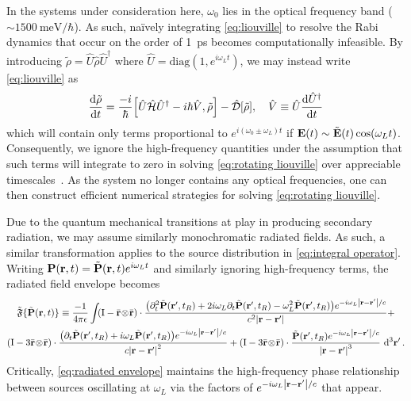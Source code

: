 In the systems under consideration here, $\omega_0$ lies in the optical frequency band ($\sim \SI{1500}{\milli\eV\per\hbar}$).
As such, na\"ively integrating \cref{eq:liouville} to resolve the Rabi dynamics that occur on the order of \SI{1}{\pico\second} becomes computationally infeasible.
By introducing $\tilde{\rho} = \hat{U} \hat{\rho} \hat{U}^\dagger$ where $\hat{U} = \mathrm{diag}(1, e^{i \omega_L t})$, we may instead write \cref{eq:liouville} as
\begin{equation}
  \dv{\tilde{\rho}}{t} = \frac{-i}{\hbar} \commutator{\hat{U} \hat{\mathcal{H}} \hat{U}^\dagger - i \hbar \hat{V}}{\tilde{\rho}} - \hat{\mathcal{D}}\qty[\tilde{\rho}], \quad \hat{V} \equiv \hat{U} \dv{\hat{U}^\dagger}{t}
  \label{eq:rotating liouville}
\end{equation}
which will contain only terms proportional to $e^{i (\omega_0 \pm \omega_L) t}$ if $\vb{E}(t) \sim \tilde{\vb{E}}(t)\cos(\omega_L t)$.
Consequently, we ignore the high-frequency quantities under the assumption that such terms will integrate to zero in solving \cref{eq:rotating liouville} over appreciable timescales~\cite{Allen1975}. As the system no longer contains any optical frequencies, one can then construct efficient numerical strategies for solving \cref{eq:rotating liouville}.

Due to the quantum mechanical transitions at play in producing secondary radiation, we may assume similarly monochromatic radiated fields.
As such, a similar transformation applies to the source distribution in \cref{eq:integral operator}.
Writing $\vb{P}(\vb{r}, t) = \tilde{\vb{P}}(\vb{r}, t)e^{i \omega_L t}$ and similarly ignoring high-frequency terms, the radiated field envelope becomes
\begin{equation}
  \begin{gathered}
    \tilde{\mathfrak{F}}\{ \tilde{\vb{P}}(\vb{r}, t) \} \equiv \frac{-1}{4\pi \epsilon} \int_{}
    \qty(\mathrm{I} -  \bar{\vb{r}} \! \otimes \! \bar{\vb{r}} ) \cdot \frac{\qty(\partial_t^2 \tilde{\vb{P}}(\vb{r}', t_R) + 2 i \omega_L \partial_t \tilde{\vb{P}}(\vb{r}', t_R) - \omega_L^2 \tilde{\vb{P}}(\vb{r}', t_R)) e^{-i \omega_L \abs{\vb{r} - \vb{r}'}/c}}{c^2 \abs{\vb{r}-\vb{r}'}} + \\
    \qty(\mathrm{I} - 3\bar{\vb{r}} \! \otimes \! \bar{\vb{r}} ) \cdot \frac{\qty(\partial_t \tilde{\vb{P}}(\vb{r}', t_R) + i \omega_L \tilde{\vb{P}}(\vb{r}', t_R))e^{-i \omega_L \abs{\vb{r} - \vb{r}'}/c}}{c \abs{\vb{r}-\vb{r}'}^2} +
    \qty(\mathrm{I} - 3\bar{\vb{r}} \! \otimes \! \bar{\vb{r}} ) \cdot \frac{                \tilde{\vb{P}}(\vb{r}', t_R) e^{-i \omega_L \abs{\vb{r} - \vb{r}'}/c}}{\abs{\vb{r}-\vb{r}'}^3}
  \, \dd[3]{\vb{r}'}.
  \end{gathered}
  \label{eq:radiated envelope}
\end{equation}
Critically, \cref{eq:radiated envelope} maintains the high-frequency phase relationship between sources oscillating at $\omega_L$ via the factors of $e^{-i \omega_L \abs{\vb{r} - \vb{r}'}/c}$ that appear.
